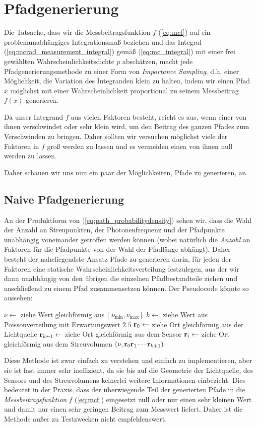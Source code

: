 	\section{Pfadgenerierung}
	Die Tatsache, dass wir die Messbeitragsfunktion $f$ (\ref{eq:mcf}) auf ein pro\-blem\-un\-ab\-hän\-gi\-ges Integrationsmaß beziehen und das Integral (\ref{eq:mcrad_measurement_integral}) gemäß (\ref{eq:mc_integral}) mit einer frei gewählten Wahrscheinlichkeitsdichte $p$ abschätzen, macht jede Pfadgenerierungsmethode zu einer Form von {\em Importance Sampling}, d.h. einer Möglichkeit, die Variation des Integranden klein zu halten, indem wir einen Pfad ${\overline x}$ möglichst mit einer Wahrscheinlichkeit proportional zu seinem Messbeitrag $f({\overline x})$ generieren.
	
	Da unser Integrand $f$ aus vielen Faktoren besteht, reicht es aus, wenn einer von ihnen verschwindet oder sehr klein wird, um den Beitrag des ganzen Pfades zum Verschwinden zu bringen. Daher sollten wir versuchen möglichst viele der Faktoren in $f$ groß werden zu lassen und es vermeiden einen von ihnen null werden zu lassen.
	
	Daher schauen wir uns nun ein paar der Möglichkeiten, Pfade zu generieren, an.
	\subsection{Naive Pfadgenerierung}
	An der Produktform von (\ref{eq:path_probabilitydensity}) sehen wir, dass die Wahl der Anzahl an Streupunkten, der Photonenfrequenz und der Pfadpunkte unabhängig voneinander getroffen werden können (wobei natürlich die {\em Anzahl} an Faktoren für die Pfadpunkte von der Wahl der Pfadlänge abhängt). Daher besteht der naheliegendste Ansatz Pfade zu generieren darin, für jeden der Faktoren eine statische Wahrscheinlichkeitsverteilung festzulegen, aus der wir dann unabhängig von den übrigen die einzelnen Pfadbestandteile ziehen und anschließend zu einem Pfad zusammensetzen können. Der Pseudocode könnte so aussehen:
	\begin{algorithmic}
		\STATE $\nu \leftarrow$ ziehe Wert gleichförmig aus $[\nu_\text{min},\nu_\text{max}]$
		\STATE $k \leftarrow$ ziehe Wert aus Poissonverteilung mit Erwartungswert $2.5$
		\STATE $\mathbf{r}_0 \leftarrow$ ziehe Ort gleichförmig aus der Lichtquelle
		\STATE $\mathbf{r}_{k+1} \leftarrow$ ziehe Ort gleichförmig aus dem Sensor
			\STATE $\mathbf{r}_i \leftarrow$ ziehe Ort gleichförmig aus dem Streuvolumen
	  \ENDFOR
	  \RETURN $(\nu,\mathbf{r}_0\mathbf{r}_1\cdots\mathbf{r}_{k+1})$
	\end{algorithmic}
	Diese Methode ist zwar einfach zu verstehen und einfach zu implementieren, aber sie ist fast immer sehr ineffizient, da sie bis auf die Geometrie der Lichtquelle, des Sensors und des Streuvolumens keinerlei weitere Informationen einbezieht. Dies bedeutet in der Praxis, dass der überwiegende Teil der generierten Pfade in die {\em Messbeitragsfunktion} $f$ (\ref{eq:mcf}) eingesetzt null oder nur einen sehr kleinen Wert und damit nur einen sehr geringen Beitrag zum Messwert liefert. Daher ist die Methode außer zu Testzwecken nicht empfehlenswert.
	

